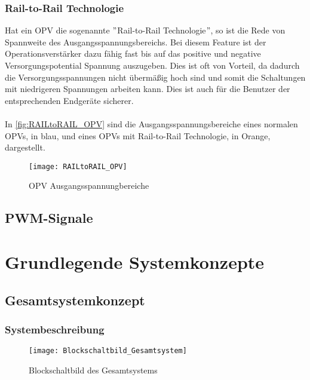 \documentclass[titlepage,12pt,twoside]{article}
\begin{document}
\subsubsection{Rail-to-Rail Technologie}
Hat ein OPV die sogenannte $"$Rail-to-Rail Technologie$"$, so ist die Rede von Spannweite des Ausgangsspannungsbereichs. Bei diesem Feature
ist der Operationsverstärker dazu fähig fast bis auf das positive und negative Versorgungspotential Spannung auszugeben. Dies ist oft 
von Vorteil, da dadurch die Versorgungsspannungen nicht übermäßig hoch sind und somit die Schaltungen mit niedrigeren Spannungen arbeiten
kann. Dies ist auch für die Benutzer der entsprechenden Endgeräte sicherer.\\
\\
In \autoref{fig:RAILtoRAIL_OPV} sind die Ausgangsspannungsbereiche eines normalen OPVs, in blau, und eines OPVs mit Rail-to-Rail Technologie,
in Orange, dargestellt. \\
\begin{figure}[H]
	\begin{center}
		\scalebox{1.2}
		{\texttt{[image: RAILtoRAIL\_OPV]}}
		\caption{OPV Ausgangsspannungbereiche}
		\label{fig:RAILtoRAIL_OPV}
	\end{center}
\end{figure}

\subsection{PWM-Signale}


\section{Grundlegende Systemkonzepte}

\subsection{Gesamtsystemkonzept}

\subsubsection{Systembeschreibung}

	\begin{figure}[H]
		\begin{center}
			\scalebox{1.2}
			{\texttt{[image: Blockschaltbild\_Gesamtsystem]}}
			\caption{Blockschaltbild des Gesamtsystems}
			\label{fig:Blockschaltbild_Gesamtsystem}		
		\end{center}
	\end{figure}
\end{document}
